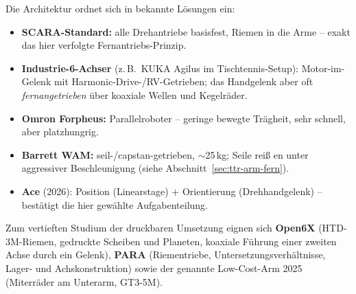 Die Architektur ordnet sich in bekannte L\"osungen ein:
\begin{itemize}
  \item \textbf{SCARA-Standard:} alle Drehantriebe basisfest, Riemen in die Arme
        -- exakt das hier verfolgte Fernantriebs-Prinzip.
  \item \textbf{Industrie-6-Achser} (z.\,B.\ KUKA Agilus im Tischtennis-Setup):
        Motor-im-Gelenk mit Harmonic-Drive-/RV-Getrieben; das Handgelenk aber oft
        \emph{fernangetrieben} \"uber koaxiale Wellen und Kegelr\"ader.
  \item \textbf{Omron Forpheus:} Parallelroboter -- geringe bewegte Tr\"agheit,
        sehr schnell, aber platzhungrig.
  \item \textbf{Barrett WAM:} seil-/capstan-getrieben, $\sim$25\,kg; Seile rei\ss
        en unter aggressiver Beschleunigung (siehe
        Abschnitt~\ref{sec:ttr-arm-fern}).
  \item \textbf{Ace} (2026): Position (Linearstage) $+$ Orientierung
        (Drehhandgelenk) -- best\"atigt die hier gew\"ahlte Aufgabenteilung.
\end{itemize}
Zum vertieften Studium der druckbaren Umsetzung eignen sich \textbf{Open6X}
(HTD-3M-Riemen, gedruckte Scheiben und Planeten, koaxiale F\"uhrung einer zweiten
Achse durch ein Gelenk), \textbf{PARA} (Riementriebe, Untersetzungsverh\"altnisse,
Lager- und Achskonstruktion) sowie der genannte Low-Cost-Arm 2025 (Miterr\"ader am
Unterarm, GT3-5M).

